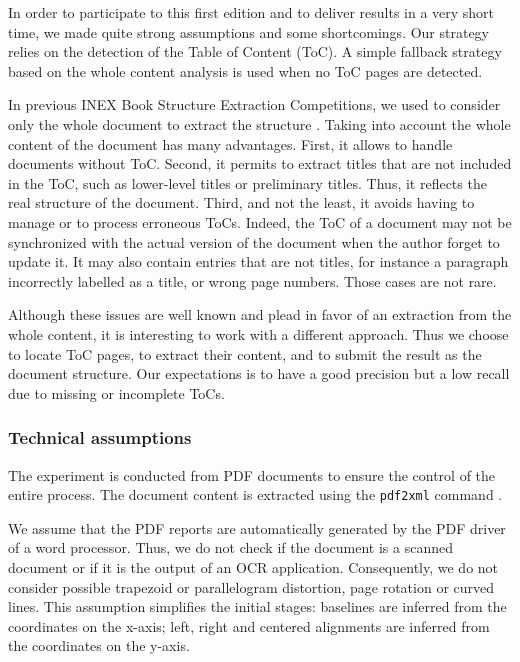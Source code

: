 In order to participate to this first edition and to deliver results in a very short time, we made quite strong assumptions and some shortcomings. Our strategy relies on the detection of the Table of Content (ToC). A simple fallback strategy based on the whole content analysis is used when no ToC pages are detected.

In previous INEX Book Structure Extraction Competitions, we used to consider only the whole document to extract the structure \cite{10.1007/978-3-642-14556-8_18,DBLP:conf/inex/GiguetL10,Giguet2009}.
Taking into account the whole content of the document has many advantages. First, it allows to handle documents without ToC. Second, it permits to extract titles that are not included in the ToC, such as lower-level titles or preliminary titles. Thus, it reflects the real structure of the document. 
Third, and not the least, it avoids having to manage or to process erroneous ToCs. Indeed, the ToC of a document may not be synchronized with the actual version of the document when the author forget to update it. It may also contain entries that are not titles, for instance a paragraph incorrectly labelled as a title, or wrong page numbers. Those cases are not rare. 

Although these issues are well known and plead in favor of an extraction from the whole content, it is interesting to work with a different approach. Thus we choose to locate ToC pages, to extract their content, and to submit the result as the document structure. Our expectations is to have a good precision but a low recall due to missing or incomplete ToCs.

\subsubsection{Technical assumptions}

The experiment is conducted from PDF documents to ensure the control of
the entire process. The document content is extracted using the \texttt{pdf2xml} command \cite{Dejean:2007}.

We assume that the PDF reports are automatically generated by the PDF driver of a word processor. Thus, we do not check if the document is a scanned document or if it is the output of an OCR application. Consequently, we do not consider possible trapezoid or parallelogram distortion, page rotation or curved lines. This assumption simplifies the initial stages: baselines are inferred from the coordinates on the x-axis; left, right and centered alignments are inferred from the coordinates on the y-axis.


